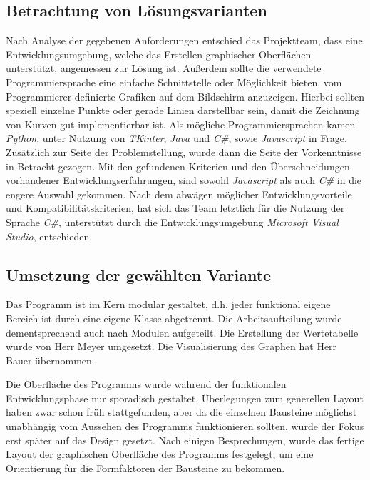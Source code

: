 \documentclass{article}
\begin{document}
\subsection{Betrachtung von Lösungsvarianten}

    Nach Analyse der gegebenen Anforderungen entschied das Projektteam, dass eine Entwicklungsumgebung, welche das Erstellen graphischer Oberflächen unterstützt, angemessen zur Lösung ist.
    Außerdem sollte die verwendete Programmiersprache eine einfache Schnittstelle oder Möglichkeit bieten, vom Programmierer definierte Grafiken auf dem Bildschirm anzuzeigen.
    Hierbei sollten speziell einzelne Punkte oder gerade Linien darstellbar sein, damit die Zeichnung von Kurven gut implementierbar ist.
    Als mögliche Programmiersprachen kamen \textit{\glqq Python\grqq{}}, unter Nutzung von \textit{\glqq TKinter\grqq{}}, \textit{\glqq Java\grqq{}} und \textit{\glqq C\#\grqq{}}, sowie \textit{\glqq Javascript\grqq{}} in Frage.
    Zusätzlich zur Seite der Problemstellung, wurde dann die Seite der Vorkenntnisse in Betracht gezogen.
    Mit den gefundenen Kriterien und den Überschneidungen vorhandener Entwicklungserfahrungen, sind sowohl \textit{\glqq Javascript\grqq{}} als auch \textit{\glqq C\#\grqq{}} in die engere Auswahl gekommen.
    Nach dem abwägen möglicher Entwicklungsvorteile und Kompatibilitätskriterien, hat sich das Team letztlich für die Nutzung der Sprache \textit{\glqq C\#\grqq{}}, unterstützt durch die Entwicklungsumgebung \textit{\glqq Microsoft Visual Studio\grqq{}}, entschieden.

\subsection{Umsetzung der gewählten Variante}

    Das Programm ist im Kern modular gestaltet, d.h. jeder funktional eigene Bereich ist durch eine eigene Klasse abgetrennt.
    Die Arbeitsaufteilung wurde dementsprechend auch nach Modulen aufgeteilt.
    Die Erstellung der Wertetabelle wurde von Herr Meyer umgesetzt.
    Die Visualisierung des Graphen hat Herr Bauer übernommen.

    Die Oberfläche des Programms wurde während der funktionalen Entwicklungsphase nur sporadisch gestaltet.
    Überlegungen zum generellen Layout haben zwar schon früh stattgefunden, aber da die einzelnen Bausteine möglichst unabhängig vom Aussehen des Programms funktionieren sollten, wurde der Fokus erst später auf das Design gesetzt.
    Nach einigen Besprechungen, wurde das fertige Layout der graphischen Oberfläche des Programms festgelegt, um eine Orientierung für die Formfaktoren der Bausteine zu bekommen.
\end{document}
